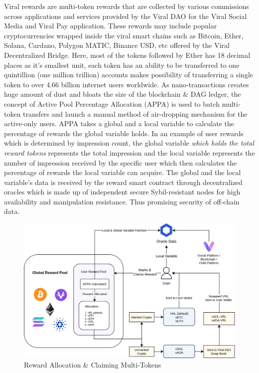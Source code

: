 \documentclass[conference]{IEEEtran}
\begin{document}
Viral rewards are multi-token rewards that are collected by various commissions across applications and services provided by the Viral DAO for the Viral Social Media and Viral Pay application. These rewards may include popular cryptocurrencies wrapped inside the viral smart chains such as Bitcoin, Ether, Solana, Cardano, Polygon MATIC, Binance USD, etc offered by the Viral Decentralized Bridge. Here, most of the tokens followed by Ether has 18 decimal places as it's smallest unit, each token has an ability to be transferred to one quintillion (one million trillion) accounts makes possibility of transferring a single token to over 4.66 billion internet users worldwide.  As nano-transactions creates huge amount of dust and bloats the size of the blockchain \& DAG ledger, the concept of Active Pool Percentage Allocation (APPA) is used to batch multi-token transfers and launch a manual method of air-dropping mechanism for the active-only users.  APPA takes a global and a local variable to calculate the percentage of rewards the global variable holds. In an example of user rewards which is determined by impression count, the global variable \textit{which holds the total reward tokens} represents the total impression and the local variable represents the number of impression received by the specific user which then calculates the percentage of rewards the local variable can acquire. The global and the local variable's data is received by the reward smart contract through decentralized oracles which  is made up of independent secure Sybil-resistant nodes for high availability and manipulation resistance. Thus promising security of off-chain data. \\

\begin{figure}
\begin{center}
\includegraphics[width=12cm]{portfolio-reward}
\caption{Reward Allocation \& Claiming Multi-Tokens }
\end{center}
\end{figure}
\end{document}
